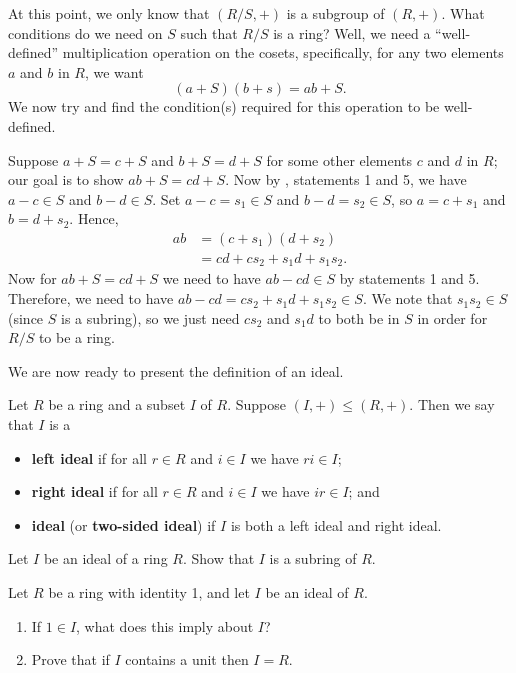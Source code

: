At this point, we only know that $(R/S,+)$ is a subgroup of $(R,+)$. What conditions do we need on $S$ such that $R/S$ is a ring? Well, we need a ``well-defined'' multiplication operation on the cosets, specifically, for any two elements $a$ and $b$ in $R$, we want
\[
    (a+S)(b+s) = ab + S.
\]
We now try and find the condition(s) required for this operation to be well-defined.

Suppose $a+S = c+S$ and $b+S = d+S$ for some other elements $c$ and $d$ in $R$; our goal is to show $ab+S = cd+S$. Now by , statements 1 and 5, we have $a-c \in S$ and $b-d \in S$. Set $a-c = s_1 \in S$ and $b-d = s_2 \in S$, so $a = c+s_1$ and $b = d+s_2$. Hence,
\begin{align*}
    ab &= (c+s_1)(d+s_2)\\
    &= cd + cs_2 + s_1d + s_1s_2.
\end{align*}
Now for $ab + S = cd+S$ we need to have $ab-cd \in S$ by  statements 1 and 5. Therefore, we need to have $ab-cd = cs_2+s_1d+s_1s_2 \in S$. We note that $s_1s_2 \in S$ (since $S$ is a subring), so we just need $cs_2$ and $s_1d$ to both be in $S$ in order for $R/S$ to be a ring.

We are now ready to present the definition of an ideal.
\begin{definition}
    Let $R$ be a ring and a subset $I$ of $R$. Suppose $(I,+) \leq (R,+)$. Then we say that $I$ is a
    \begin{itemize}
        \item \textbf{left ideal} if for all $r \in R$ and $i \in I$ we have $ri \in I$;
        \item \textbf{right ideal} if for all $r \in R$ and $i \in I$ we have $ir \in I$; and
        \item \textbf{ideal} (or \textbf{two-sided ideal}) if $I$ is both a left ideal and right ideal.
    \end{itemize} 
\end{definition}
\begin{exercise}\label{exercise-ideal-is-a-subring}
    Let $I$ be an ideal of a ring $R$. Show that $I$ is a subring of $R$.
\end{exercise}
\begin{exercise}\label{exercise-ideal-containing-1-is-whole-ring}
    Let $R$ be a ring with identity 1, and let $I$ be an ideal of $R$.
    \begin{enumerate}[label=(\roman*)]
        \item If $1 \in I$, what does this imply about $I$?
        \item Prove that if $I$ contains a unit then $I = R$.
    \end{enumerate}
\end{exercise}


